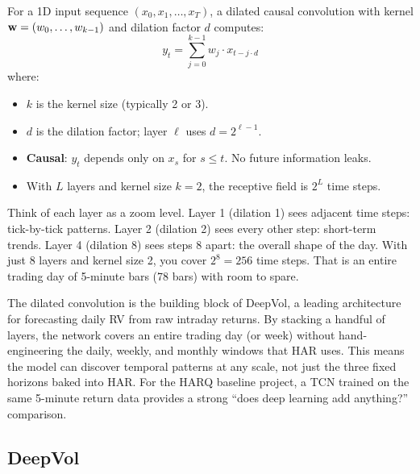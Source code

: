 \begin{definition}
For a 1D input sequence $(x_0, x_1, \ldots, x_T)$, a dilated causal convolution with kernel $\mathbf{w} = (w_0, \ldots, w_{k-1})$ and dilation factor $d$ computes:
\begin{equation}\label{eq:dilated-conv}
  y_t = \sum_{j=0}^{k-1} w_j \cdot x_{t - j \cdot d}
\end{equation}
where:
\begin{itemize}[nosep]
  \item $k$ is the kernel size (typically 2 or 3).
  \item $d$ is the dilation factor; layer $\ell$ uses $d = 2^{\ell-1}$.
  \item \textbf{Causal}: $y_t$ depends only on $x_s$ for $s \le t$. No future information leaks.
  \item With $L$ layers and kernel size $k=2$, the receptive field is $2^L$ time steps.
\end{itemize}
\end{definition}

\begin{intuition}
Think of each layer as a zoom level.
Layer 1 (dilation 1) sees adjacent time steps: tick-by-tick patterns.
Layer 2 (dilation 2) sees every other step: short-term trends.
Layer 4 (dilation 8) sees steps 8 apart: the overall shape of the day.
With just 8 layers and kernel size 2, you cover $2^8 = 256$ time steps.
That is an entire trading day of 5-minute bars (78 bars) with room to spare.
\end{intuition}

\begin{projectconnection}
The dilated convolution is the building block of DeepVol, a leading architecture for forecasting daily RV from raw intraday returns.
By stacking a handful of layers, the network covers an entire trading day (or week) without hand-engineering the daily, weekly, and monthly windows that HAR uses.
This means the model can discover temporal patterns at any scale, not just the three fixed horizons baked into HAR.
For the HARQ baseline project, a TCN trained on the same 5-minute return data provides a strong ``does deep learning add anything?'' comparison.
\end{projectconnection}

\subsection{DeepVol}


